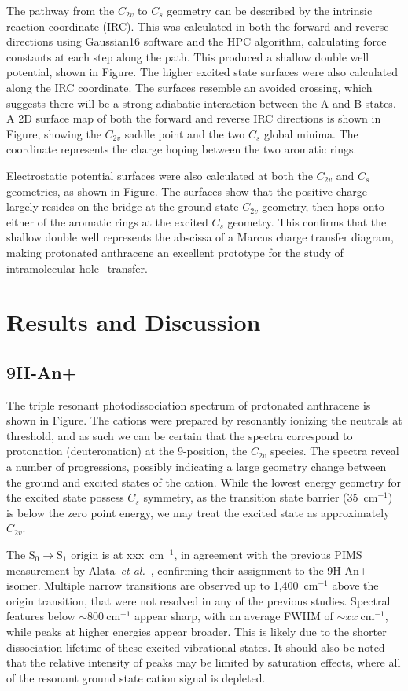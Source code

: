 \documentclass[journal=jpcafh,manuscript=article,layout=onecolumn, 12pt]{achemso}
\begin{document}
The pathway from the $C_{2v}$ to $C_s$ geometry can be described by the intrinsic reaction coordinate (IRC). This was calculated in both the forward and reverse directions using Gaussian16 software and the HPC algorithm, calculating force constants at each step along the path. This produced a shallow double well potential, shown in Figure. The higher excited state surfaces were also calculated along the IRC coordinate. The surfaces resemble an avoided crossing, which suggests there will be a strong adiabatic interaction between the A and B states. A 2D surface map of both the forward and reverse IRC directions is shown in Figure, showing the $C_{2v}$ saddle point and the two $C_s$ global minima. The coordinate represents the charge hoping between the two aromatic rings.  

Electrostatic potential surfaces were also calculated at both the $C_{2v}$ and $C_s$ geometries, as shown in Figure. The surfaces show that the positive charge largely resides on the bridge at the ground state $C_{2v}$ geometry, then hops onto either of the aromatic rings at the excited $C_s$ geometry. This confirms that the shallow double well represents the abscissa of a Marcus charge transfer diagram, making protonated anthracene an excellent prototype for the study of intramolecular hole$-$transfer.

\section{Results and Discussion}
\subsection{9H-An+}
The triple resonant photodissociation spectrum of protonated anthracene is shown in Figure. The cations were prepared by resonantly ionizing the neutrals at threshold, and as such we can be certain that the spectra correspond to protonation (deuteronation) at the 9-position, the $C_{2v}$ species. The spectra reveal a number of progressions, possibly indicating a large geometry change between the ground and excited states of the cation. While the lowest energy geometry for the excited state possess $C_s$ symmetry, as the transition state barrier (35~cm$^{-1}$) is below the zero point energy, we may treat the excited state as approximately $C_{2v}$. 

The $\text{S}_0\rightarrow \text{S}_1$ origin is at xxx~cm$^{-1}$, in agreement with the previous PIMS measurement by Alata~\emph{et al.}~\cite{ala10}, confirming their assignment to the 9H-An+ isomer. Multiple narrow transitions are observed up to 1,400~cm$^{-1}$ above the origin transition, that were not resolved in any of the previous studies. Spectral features below $\sim800~$cm$^{-1}$ appear sharp, with an average FWHM of $\sim xx~$cm$^{-1}$, while peaks at higher energies appear broader. This is likely due to the shorter dissociation lifetime of these excited vibrational states. It should also be noted that the relative intensity of peaks may be limited by saturation effects, where all of the resonant ground state cation signal is depleted.
\end{document}
